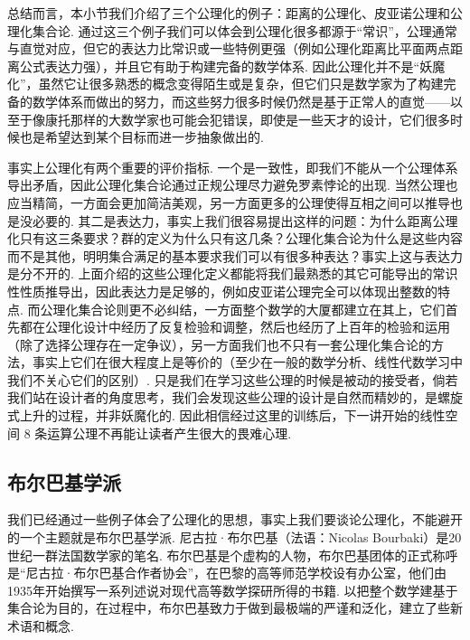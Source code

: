 
总结而言，本小节我们介绍了三个公理化的例子：距离的公理化、皮亚诺公理和公理化集合论. 通过这三个例子我们可以体会到公理化很多都源于``常识''，公理通常与直觉对应，但它的表达力比常识或一些特例更强（例如公理化距离比平面两点距离公式表达力强），并且它有助于构建完备的数学体系. 因此公理化并不是``妖魔化''，虽然它让很多熟悉的概念变得陌生或是复杂，但它们只是数学家为了构建完备的数学体系而做出的努力，而这些努力很多时候仍然是基于正常人的直觉——以至于像康托那样的大数学家也可能会犯错误，即使是一些天才的设计，它们很多时候也是希望达到某个目标而进一步抽象做出的.

事实上公理化有两个重要的评价指标. 一个是一致性，即我们不能从一个公理体系导出矛盾，因此公理化集合论通过正规公理尽力避免罗素悖论的出现. 当然公理也应当精简，一方面会更加简洁美观，另一方面更多的公理使得互相之间可以推导也是没必要的. 其二是表达力，事实上我们很容易提出这样的问题：为什么距离公理化只有这三条要求？群的定义为什么只有这几条？公理化集合论为什么是这些内容而不是其他，明明集合满足的基本要求我们可以有很多种表达？事实上这与表达力是分不开的. 上面介绍的这些公理化定义都能将我们最熟悉的其它可能导出的常识性性质推导出，因此表达力是足够的，例如皮亚诺公理完全可以体现出整数的特点. 而公理化集合论则更不必纠结，一方面整个数学的大厦都建立在其上，它们首先都在公理化设计中经历了反复检验和调整，然后也经历了上百年的检验和运用（除了选择公理存在一定争议），另一方面我们也不只有一套公理化集合论的方法，事实上它们在很大程度上是等价的（至少在一般的数学分析、线性代数学习中我们不关心它们的区别）. 只是我们在学习这些公理的时候是被动的接受者，倘若我们站在设计者的角度思考，我们会发现这些公理的设计是自然而精妙的，是螺旋式上升的过程，并非妖魔化的. 因此相信经过这里的训练后，下一讲开始的线性空间 8 条运算公理不再能让读者产生很大的畏难心理.

\subsection{布尔巴基学派}

我们已经通过一些例子体会了公理化的思想，事实上我们要谈论公理化，不能避开的一个主题就是布尔巴基学派. 尼古拉·布尔巴基（法语：Nicolas Bourbaki）是20世纪一群法国数学家的笔名. 布尔巴基是个虚构的人物，布尔巴基团体的正式称呼是``尼古拉·布尔巴基合作者协会''，在巴黎的高等师范学校设有办公室，他们由1935年开始撰写一系列述说对现代高等数学探研所得的书籍. 以把整个数学建基于集合论为目的，在过程中，布尔巴基致力于做到最极端的严谨和泛化，建立了些新术语和概念.

